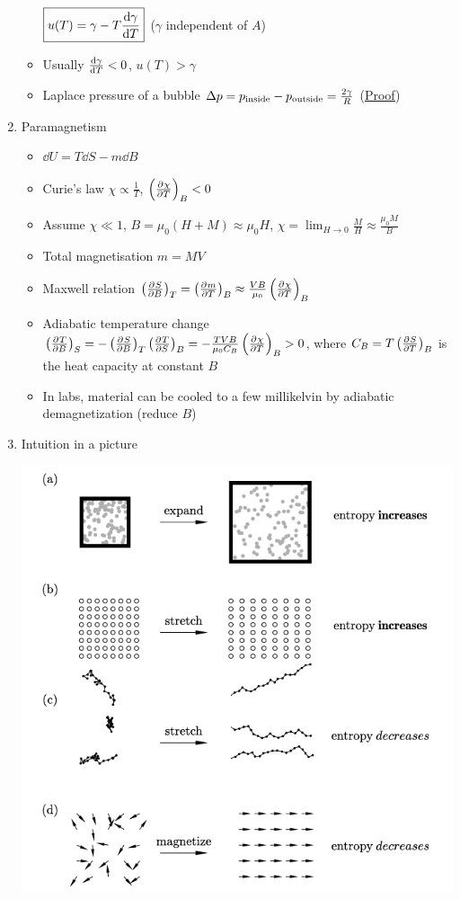 \documentclass{article}
\theoremstyle{remark}
\newcommand{\mylabel}[2]{\hyperref[#1]{#2}\label{back:#1}}
\newcommand{\s}[1]{\textsubscript{#1}}
\newcommand{\ppdv}[4][]{\left(\pdv[#1]{#2}{#3}\right)_{#4}}
\begin{document}
\begin{enumerate}
\begin{itemize}
            $\boxed{u(T)=\gamma-T\dv{\gamma}{T}}$ ($\gamma$ independent of $A$)
        \item Usually $\dv{\gamma}{T}<0$, $u(T)>\gamma$
        \item Laplace pressure of a bubble $\Delta p=p\s{inside}-p\s{outside}=\frac{2\gamma}{R}$ (\mylabel{laplace_pressure}{Proof})
    \end{itemize}
    \item Paramagnetism\begin{itemize}
            \item $\dd U=T\dd S-m\dd B$
            \item Curie's law $\chi\propto\frac{1}{T}$, $\ppdv{\chi}{T}{B}<0$
            \item Assume $\chi\ll 1$, $B=\mu_0(H+M)\approx\mu_0 H$, $\chi=\lim_{H\rightarrow0}\frac{M}{H}\approx\frac{\mu_0M}{B}$
            \item Total magnetisation $m=MV$
            \item Maxwell relation $\ppdv{S}{B}{T}=\ppdv{m}{T}{B}\approx\frac{VB}{\mu_0}\ppdv{\chi}{T}{B}$
            \item Adiabatic temperature change $\ppdv{T}{B}{S}=-\ppdv{S}{B}{T}\ppdv{T}{S}{B}=-\frac{TVB}{\mu_0C_B}\ppdv{\chi}{T}{B}>0$, where $C_B=T\ppdv{S}{T}{B}$ is the heat capacity at constant $B$
            \item In labs, material can be cooled to a few millikelvin by adiabatic demagnetization (reduce $B$)
        \end{itemize}
    \item Intuition in a picture\begin{center}
            \includegraphics*[width=0.3\linewidth]{intuition_4_situations.png}
        \end{center}
\end{enumerate}
\end{document}

